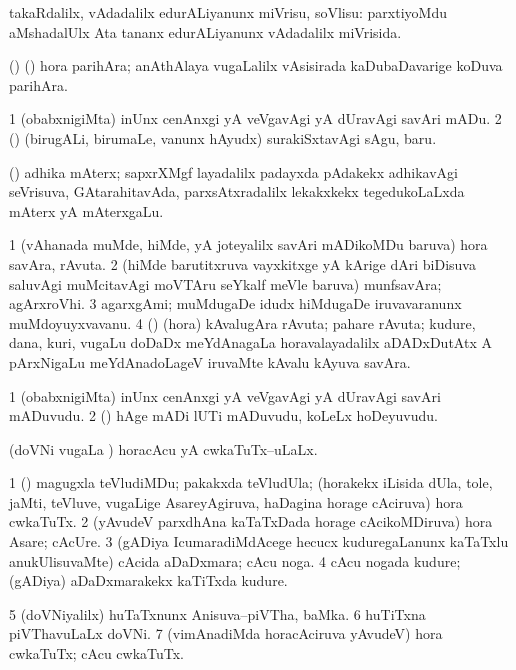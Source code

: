 \bentry
{}
\gl{\sakirx}
\bmng
takaRdalilx, vAdadalilx edurALiyanunx miVrisu, soVlisu:  parxtiyoMdu aMshadalUlx Ata tananx edurALiyanunx vAdadalilx miVrisida. 
\emng
\eentry

\bentry
{}
\gl{\nA}
\bmng
(\birx) (\ca) hora parihAra; anAthAlaya \mo vugaLalilx vAsisirada kaDubaDavarige koDuva parihAra. 
\emng
\eentry

\bentry
{}
\gl{\sakirx}
\bmng
\bnum
\num{1} (obabxnigiMta) inUnx cenAnxgi yA veVgavAgi yA dUravAgi savAri mADu. 
\num{2} (\nw) (birugALi, birumaLe, \mo vanunx hAyudx) surakiSxtavAgi sAgu, baru. 
\enum
\emng
\eentry

\bentry
{}
\gl{\nA}
\bmng
(\CaM) adhika mAterx; sapxrXMgf layadalilx padayxda pAdakekx adhikavAgi seVrisuva, GAtarahitavAda, parxsAtxradalilx lekakxkekx tegedukoLaLxda mAterx yA mAterxgaLu. 
\emng
\eentry

\bentry
{}
\gl{\nA}
\bmng
\bnum
\num{1} (vAhanada muMde, hiMde, yA joteyalilx savAri mADikoMDu baruva) hora savAra, rAvuta. 
\num{2} (hiMde barutitxruva vayxkitxge yA kArige dAri biDisuva saluvAgi muMcitavAgi moVTAru seYkalf meVle baruva) munfsavAra; agArxroVhi. 
\num{3} agarxgAmi; muMdugaDe idudx hiMdugaDe iruvavaranunx muMdoyuyxvavanu. 
\num{4} (\ame) (hora) kAvalugAra rAvuta; pahare rAvuta; kudure, dana, kuri, \mo vugaLu doDaDx meYdAnagaLa horavalayadalilx aDADxDutAtx A pArxNigaLu meYdAnadoLageV iruvaMte kAvalu kAyuva savAra. 
\enum
\emng
\eentry

\bentry
{}
\gl{\nA}
\bmng
\bnum
\num{1} (obabxnigiMta) inUnx cenAnxgi yA veVgavAgi yA dUravAgi savAri mADuvudu. 
\num{2} (\kanmu) hAge mADi lUTi mADuvudu, koLeLx hoDeyuvudu. 
\enum
\emng
\eentry

\bentry
{}
\gl{\gu}
\bmng
(doVNi \mo vugaLa \vi) horacAcu yA cwkaTuTx--uLaLx. 
\emng
\eentry

\bentry
{}
\gl{\nA}
\bmng
\bnum
\num{1} (\nw) magugxla teVludiMDu; pakakxda teVludUla; (horakekx iLisida dUla, tole, jaMti, teVluve, \mo vugaLige AsareyAgiruva, haDagina horage cAciruva) hora cwkaTuTx. 
\num{2} (yAvudeV parxdhAna kaTaTxDada horage cAcikoMDiruva) hora Asare; cAcUre. 
\num{3} (gADiya IcumaradiMdAcege hecucx kuduregaLanunx kaTaTxlu anukUlisuvaMte) cAcida aDaDxmara; cAcu noga. 
\num{4} cAcu nogada kudure; (gADiya) aDaDxmarakekx kaTiTxda kudure. 
\num{5} (doVNiyalilx) huTaTxnunx Anisuva--piVTha, baMka. 
\num{6} huTiTxna piVThavuLaLx doVNi. 
\num{7} (vimAnadiMda horacAciruva yAvudeV) hora cwkaTuTx; cAcu cwkaTuTx. 
\enum
\emng
\eentry

